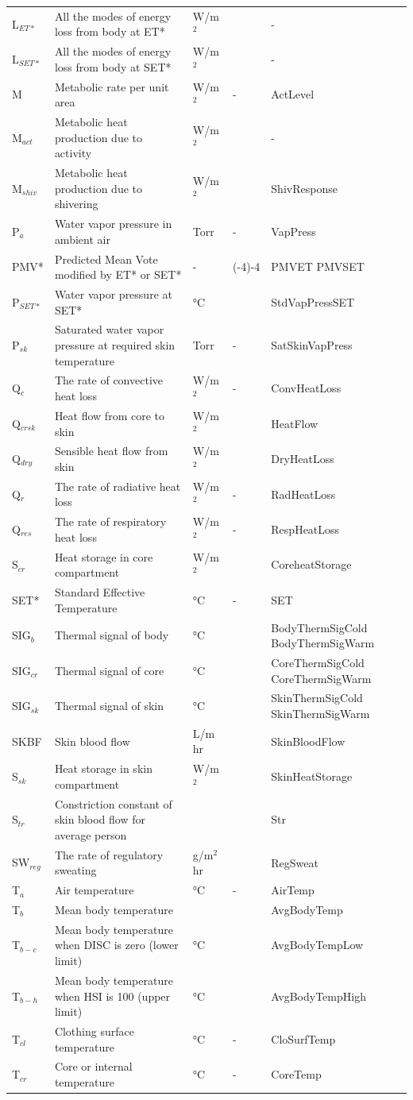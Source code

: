\begin{longtable}[c]{p{1.2in}p{2.0in}p{0.8in}p{0.8in}p{1.2in}}
L\(_{ET*}\) & All the modes of energy loss from body at ET* & W/m\(^{2}\) & ~ & - \tabularnewline
L\(_{SET*}\) & All the modes of energy loss from body at SET* & W/m\(^{2}\) & ~ & - \tabularnewline
M & Metabolic rate per unit area & W/m\(^{2}\) & - & ActLevel \tabularnewline
M\(_{act}\) & Metabolic heat production due to activity & W/m\(^{2}\) & ~ & - \tabularnewline
M\(_{shiv}\) & Metabolic heat production due to shivering & W/m\(^{2}\) & ~ & ShivResponse \tabularnewline
P\(_{a}\) & Water vapor pressure in ambient air & Torr & - & VapPress \tabularnewline
PMV* & Predicted Mean Vote modified by ET* or SET* & - & (-4)-4 & PMVET PMVSET \tabularnewline
P\(_{SET*}\) & Water vapor pressure at SET* & °C & ~ & StdVapPressSET \tabularnewline
P\(_{sk}\) & Saturated water vapor pressure at required skin temperature & Torr & - & SatSkinVapPress \tabularnewline
Q\(_{c}\) & The rate of convective heat loss & W/m\(^{2}\) & - & ConvHeatLoss \tabularnewline
Q\(_{crsk}\) & Heat flow from core to skin & W/m\(^{2}\) & ~ & HeatFlow \tabularnewline
Q\(_{dry}\) & Sensible heat flow from skin & W/m\(^{2}\) & ~ & DryHeatLoss \tabularnewline
Q\(_{r}\) & The rate of radiative heat loss & W/m\(^{2}\) & - & RadHeatLoss \tabularnewline
Q\(_{res}\) & The rate of respiratory heat loss & W/m\(^{2}\) & - & RespHeatLoss \tabularnewline
S\(_{cr}\) & Heat storage in core compartment & W/m\(^{2}\) & ~ & CoreheatStorage \tabularnewline
SET* & Standard Effective Temperature & °C & - & SET \tabularnewline
SIG\(_{b}\) & Thermal signal of body & °C & ~ & BodyThermSigCold BodyThermSigWarm \tabularnewline
SIG\(_{cr}\) & Thermal signal of core & °C & ~ & CoreThermSigCold CoreThermSigWarm \tabularnewline
SIG\(_{sk}\) & Thermal signal of skin & °C & ~ & SkinThermSigCold SkinThermSigWarm \tabularnewline
SKBF & Skin blood flow & L/m  hr & ~ & SkinBloodFlow \tabularnewline
S\(_{sk}\) & Heat storage in skin compartment & W/m\(^{2}\) & ~ & SkinHeatStorage \tabularnewline
S\(_{tr}\) & Constriction constant of skin blood flow for average person & ~ & ~ & Str \tabularnewline
SW\(_{reg}\) & The rate of regulatory sweating & g/m\(^{2}\)hr & ~ & RegSweat \tabularnewline
T\(_{a}\) & Air temperature & °C & - & AirTemp \tabularnewline
T\(_{b}\) & Mean body temperature & ~ & ~ & AvgBodyTemp \tabularnewline
T\(_{b-c}\) & Mean body temperature when DISC is zero (lower limit) & °C & ~ & AvgBodyTempLow \tabularnewline
T\(_{b-h}\) & Mean body temperature when HSI is 100 (upper limit) & °C & ~ & AvgBodyTempHigh \tabularnewline
T\(_{cl}\) & Clothing surface temperature & °C & - & CloSurfTemp \tabularnewline
T\(_{cr}\) & Core or internal temperature & °C & - & CoreTemp \tabularnewline

\end{longtable}
